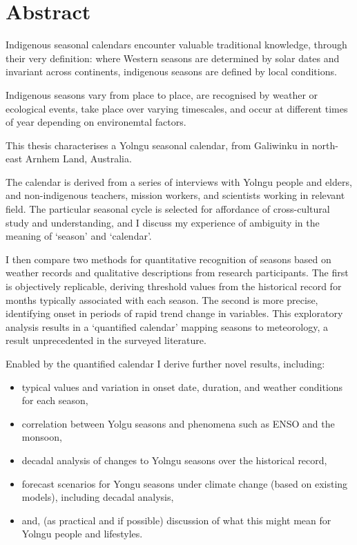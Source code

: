 \chapter{Abstract}

Indigenous seasonal calendars encounter valuable traditional knowledge, through their very definition:
where Western seasons are determined by solar dates and invariant across continents,
indigenous seasons are defined by local conditions.

Indigenous seasons vary from place to place, are recognised by weather or ecological events,
take place over varying timescales, and occur at different times of year depending on environemtal factors.

This thesis characterises a Yolngu seasonal calendar, from Galiwinku in north-east Arnhem Land, Australia.

The calendar is derived from a series of interviews with Yolngu people and elders, and
non-indigenous teachers, mission workers, and scientists working in relevant field.
The particular seasonal cycle is selected for affordance of cross-cultural study and understanding,
and I discuss my experience of ambiguity in the meaning of `season' and `calendar'.

I then compare two methods for quantitative recognition of seasons based on weather records
and qualitative descriptions from research participants.  The first is objectively replicable,
deriving threshold values from the historical record for months typically associated with each season.
The second is more precise, identifying onset in periods of rapid trend change in variables.
This exploratory analysis results in a `quantified calendar' mapping seasons to meteorology,
a result unprecedented in the surveyed literature.

Enabled by the quantified calendar I derive further novel results, including:
\begin{itemize}
\item typical values and variation in onset date, duration, and weather conditions for each season,
\item correlation between Yolgu seasons and phenomena such as ENSO and the monsoon,
\item decadal analysis of changes to Yolngu seasons over the historical record,
\item forecast scenarios for Yongu seasons under climate change (based on existing models), including decadal analysis,
\item and, (as practical and if possible) discussion of what this might mean for Yolngu people and lifestyles.
\end{itemize}




